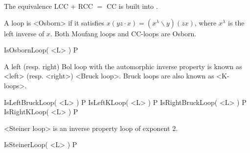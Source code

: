 The equivalence LCC $+$ RCC $=$ CC is built into {\LOOPS}.

A loop is <Osborn> if it satisfies $x(yz\cdot
x)=(x^\lambda\backslash y)(zx)$, where $x^\lambda$ is the left inverse of $x$. Both
Moufang loops and CC-loops are Osborn.

\>IsOsbornLoop( <L> ) P


A left (resp. right) Bol loop with the automorphic inverse property
is known as <left> (resp. <right>) <Bruck loop>. Bruck loops are also known as
<K-loops>.

\>IsLeftBruckLoop( <L> ) P
\>IsLeftKLoop( <L> ) P
\>IsRightBruckLoop( <L> ) P
\>IsRightKLoop( <L> ) P

<Steiner loop>
%
%
 is an inverse property loop of exponent $2$.

\>IsSteinerLoop( <L> ) P
